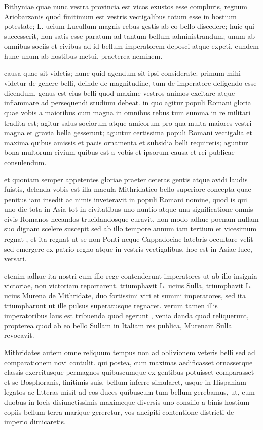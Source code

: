  Bithyniae quae nunc vestra provincia est vicos exustos esse compluris, regnum Ariobarzanis quod finitimum est vestris vectigalibus totum esse in hostium potestate; L. ucium Lucullum magnis rebus gestis ab eo bello discedere; huic qui successerit, non satis esse paratum ad tantum bellum administrandum; unum ab omnibus sociis et civibus ad id bellum imperatorem deposci atque expeti, eundem hunc unum ab hostibus metui, praeterea neminem.

 causa quae sit videtis; nunc quid agendum sit ipsi considerate. primum mihi videtur de genere belli, deinde de magnitudine, tum de imperatore deligendo esse dicendum. genus est eius belli quod maxime vestros animos excitare atque inflammare ad persequendi studium debeat. in quo agitur populi Romani gloria quae vobis a maioribus cum magna in omnibus rebus tum summa in re militari tradita est; agitur salus sociorum atque amicorum pro qua multa maiores vestri magna et gravia bella gesserunt; aguntur certissima populi Romani vectigalia et maxima quibus amissis et pacis ornamenta et subsidia belli requiretis; aguntur bona multorum civium quibus est a vobis et ipsorum causa et rei publicae consulendum.

 et quoniam semper appetentes gloriae praeter ceteras gentis atque avidi laudis fuistis, delenda vobis est illa macula Mithridatico bello superiore concepta quae penitus iam insedit ac nimis inveteravit in populi Romani nomine, quod is qui uno die tota in Asia tot in civitatibus uno nuntio atque una significatione omnis civis Romanos necandos trucidandosque curavit, non modo adhuc poenam nullam suo dignam scelere suscepit sed ab illo tempore annum iam tertium et vicesimum regnat , et ita regnat ut se non Ponti neque Cappadociae latebris occultare velit sed emergere ex patrio regno atque in vestris vectigalibus, hoc est in Asiae luce, versari.

 etenim adhuc ita nostri cum illo rege contenderunt imperatores ut ab illo insignia victoriae, non victoriam reportarent. triumphavit L. ucius Sulla, triumphavit L. ucius Murena de Mithridate, duo fortissimi viri et summi imperatores, sed ita triumpharunt ut ille pulsus superatusque regnaret. verum tamen illis imperatoribus laus est tribuenda quod egerunt , venia danda quod reliquerunt, propterea quod ab eo bello Sullam in Italiam res publica, Murenam Sulla revocavit.

 Mithridates autem omne reliquum tempus non ad oblivionem veteris belli sed ad comparationem novi contulit. qui postea, cum maximas aedificasset ornassetque classis exercitusque permagnos quibuscumque ex gentibus potuisset comparasset et se Bosphoranis, finitimis suis, bellum inferre simularet, usque in Hispaniam legatos ac litteras misit ad eos duces quibuscum tum bellum gerebamus, ut, cum duobus in locis disiunctissimis maximeque diversis uno consilio a binis hostium copiis bellum terra marique gereretur, vos ancipiti contentione districti de imperio dimicaretis.

